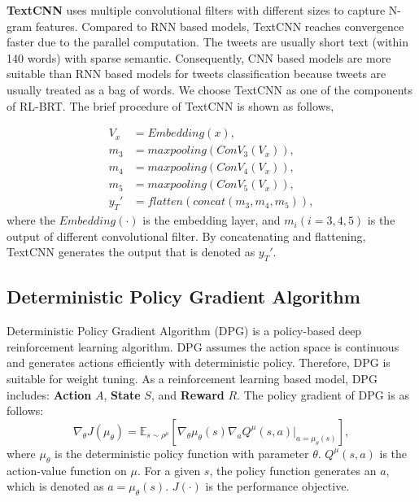 \textbf{TextCNN} \cite{DBLP:conf/emnlp/Kim14} uses multiple convolutional filters with different sizes to capture N-gram features. Compared to RNN based models, TextCNN reaches convergence faster due to the parallel computation. The tweets are usually short text (within 140 words) with sparse semantic. Consequently, CNN based models are more suitable than RNN based models for tweets classification because tweets are usually treated as a bag of words. We choose TextCNN as one of the components of RL-BRT. The brief procedure of TextCNN is shown as follows,

\begin{align}\label{eq:tcnn}
V_x &= Embedding(x), \\
m_3 &= maxpooling(ConV_3(V_x)),\\
m_4 &= maxpooling(ConV_4(V_x)),\\
m_5 &= maxpooling(ConV_5(V_x)),\\
y_T' &= flatten(concat(m_3, m_4, m_5)),
\end{align}
where the $Embedding(\cdot)$ is the embedding layer, and $m_i (i = 3,4,5)$ is the output of different convolutional filter. By concatenating and flattening, TextCNN generates the output that is denoted as $y_T'$.

\subsection{Deterministic Policy Gradient Algorithm}
Deterministic Policy Gradient Algorithm (DPG) \cite{DBLP:conf/icml/SilverLHDWR14} is a policy-based deep reinforcement learning algorithm. DPG assumes the action space is continuous and generates actions efficiently with deterministic policy. Therefore, DPG is suitable for weight tuning. As a reinforcement learning based model, DPG includes: \textbf{Action} $A$, \textbf{State} $S$, and \textbf{Reward} $R$. The policy gradient of DPG is as follows:
\begin{equation}
\nabla_\theta J(\mu_\theta) =  \mathbb{E}_{s \sim \rho^\mu} \left[\nabla_\theta \mu_\theta (s)\nabla_a Q^\mu (s, a) |_{a = \mu_\theta(s)}  \right],
\end{equation}
where $\mu_\theta$ is the deterministic policy function with parameter $\theta$. $Q^\mu(s, a)$ is the action-value function on $\mu$. For a given $s$, the policy function generates an $a$, which is denoted as $a=\mu_\theta(s)$. $J(\cdot)$ is the performance objective.
